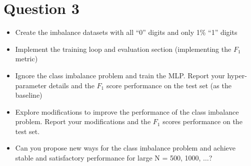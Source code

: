 \section{Question 3}

\begin{itemize}
    \item  Create the imbalance datasets with all ``0'' digits and only 1\% ``1'' digits
    \item  Implement the training loop and evaluation section (implementing the $F_1$ metric)
    \item Ignore the class imbalance problem and train the MLP. Report your hyper-parameter details
    and the $F_1$ score performance on the test set (as the baseline)
    \item Explore modifications to improve the performance of the class imbalance problem. Report
    your modifications and the $F_1$ scores performance on the test set.
    \item Can you propose new ways for the class imbalance problem and achieve stable and satisfactory performance for large N = 500, 1000, $\dots$?
\end{itemize}


